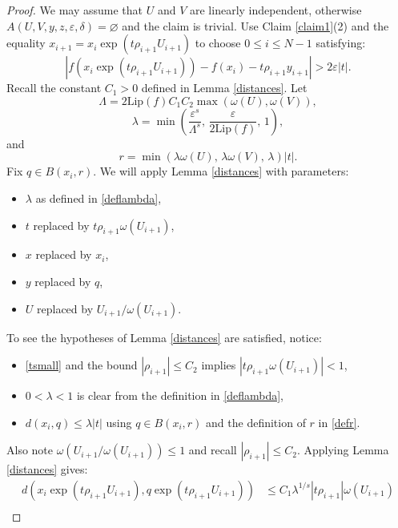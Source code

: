 \documentclass[reqno, 11pt]{amsart}
\theoremstyle{definition}
\theoremstyle{remark}
\numberwithin{theorem}{section}
\numberwithin{equation}{section}
\begin{document}
\begin{proof}
We may assume that $U$ and $V$ are linearly independent, otherwise $A(U,V,y,z,\varepsilon,\delta)=\varnothing$ and the claim is trivial. Use Claim \ref{claim1}(2) and the equality $x_{i+1}=x_{i}\exp(t\rho_{i+1}U_{i+1})$ to choose $0\leq i\leq N-1$ satisfying:
\begin{equation}\label{touse} |f(x_{i}\exp(t\rho_{i+1}U_{i+1}))-f(x_{i})-t\rho_{i+1}y_{i+1}|>2\varepsilon |t|.\end{equation}
Recall the constant $C_{1}>0$ defined in Lemma \ref{distances}. Let
\[\Lambda= 2\mathrm{Lip}(f)C_{1}C_{2}\max(\omega(U),\omega(V)),\]
\begin{equation}\label{deflambda}
\lambda=\min \left( \frac{\varepsilon^{s}}{\Lambda^s}, \,  \frac{\varepsilon}{2\mathrm{Lip}(f)}, \, 1\right),
\end{equation}
and
\begin{equation}\label{defr}
r= \min (\lambda \omega(U),\, \lambda \omega(V),\, \lambda) |t|.
\end{equation}
Fix $q\in B(x_{i}, r)$. We will apply Lemma \ref{distances} with parameters:
\begin{itemize}
\item $\lambda$ as defined in \eqref{deflambda},
\item $t$ replaced by $t \rho_{i+1} \omega(U_{i+1})$,
\item $x$ replaced by $x_{i}$,
\item $y$ replaced by $q$,
\item $U$ replaced by $U_{i+1}/\omega(U_{i+1})$.
\end{itemize}
To see the hypotheses of Lemma \ref{distances} are satisfied, notice:
\begin{itemize}
\item \eqref{tsmall} and the bound $|\rho_{i+1}|\leq C_{2}$ implies $|t \rho_{i+1} \omega(U_{i+1})|<1$,
\item $0<\lambda<1$ is clear from the definition in \eqref{deflambda},
\item $d(x_{i},q)\leq \lambda |t|$ using $q\in B(x_{i}, r)$ and the definition of $r$ in \eqref{defr}.
\end{itemize}
Also note $\omega(U_{i+1}/\omega(U_{i+1}))\leq 1$ and recall $|\rho_{i+1}|\leq C_{2}$. Applying Lemma \ref{distances} gives:
\begin{align*}
d(x_{i}\exp (t\rho_{i+1}U_{i+1}), q\exp (t\rho_{i+1}U_{i+1})) &\leq C_{1}\lambda^{1/s}|t \rho_{i+1}|  \omega(U_{i+1}) \\

\end{align*}
\end{proof}
\end{document}
